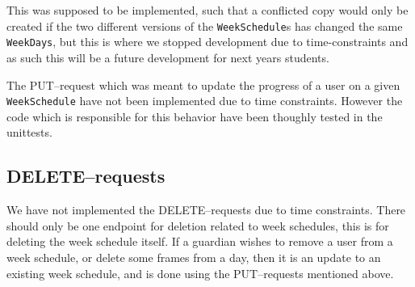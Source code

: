 This was supposed to be implemented, such that a conflicted copy would only be created if the two different versions of the \texttt{WeekSchedule}s has changed the same \texttt{WeekDays}, but this is where we stopped development due to time-constraints and as such this will be a future development for next years students.

The PUT--request which was meant to update the progress of a user on a given \texttt{WeekSchedule} have not been implemented due to time constraints.
However the code which is responsible for this behavior have been thoughly tested in the unittests.

\subsection{DELETE--requests}
We have not implemented the DELETE--requests due to time constraints.
There should only be one endpoint for deletion related to week schedules, this is for deleting the week schedule itself.
If a guardian wishes to remove a user from a week schedule, or delete some frames from a day, then it is an update to an existing week schedule, and is done using the PUT--requests mentioned above.
